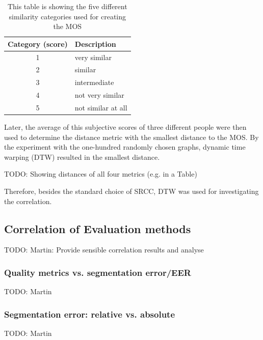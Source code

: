 \documentclass[10pt,twocolumn,letterpaper]{article}
\begin{document}
\begin{table}[ht]
\newcommand\T{\rule{0pt}{3.2ex}}
\newcommand\B{\rule[-1.8ex]{0pt}{0pt}}
\begin{center}
\begin{tabular}{| c | l |}
  \hline
  {\bf Category (score)} \T \B & {\bf Description} \\
  \hline
  1 & very similar \\
  \hline
  2 & similar \\
  \hline
  3 & intermediate \\
  \hline
  4 & not very similar \\
  \hline
  5 & not similar at all \\
  \hline
\end{tabular}
\end{center}
\caption{This table is showing the five different similarity categories used for creating the MOS}
\label{tab:resultsMOS}
\end{table}

Later, the average of this subjective scores of three different people %
were then used to determine the distance metric with the smallest distance to the MOS. By the experiment with the one-hundred randomly chosen graphs, dynamic time warping (DTW) resulted in the smallest distance. 

TODO: Showing distances of all four metrics (e.g. in a Table)

Therefore, besides the standard choice of SRCC, DTW was used for investigating the correlation. 


\subsection{Correlation of Evaluation methods}
TODO: Martin:
Provide sensible correlation results and analyse

\subsubsection{Quality metrics vs. segmentation error/EER}
TODO: Martin

\subsubsection{Segmentation error: relative vs. absolute}
TODO: Martin
\end{document}
